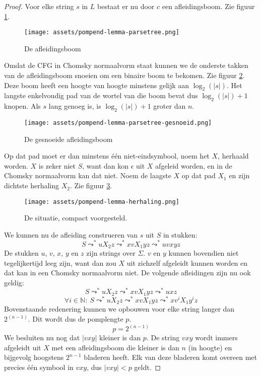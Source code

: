 \documentclass[main.tex]{subfiles}
\begin{document}
\begin{st}
\begin{proof}
    Voor elke string $s$ in $L$ bestaat er nu door $c$ een afleidingsboom. Zie figuur \ref{fig:afleidingsboom}.
    \begin{figure}[H]
      \centering
      \texttt{[image: assets/pompend-lemma-parsetree.png]}      
      \caption{De afleidingsboom}
      \label{fig:afleidingsboom}
    \end{figure}
    Omdat de CFG in Chomsky normaalvorm staat kunnen we de onderste takken van de afleidingsboom snoeien om een binaire boom te bekomen. Zie figuur \ref{fig:afleidingsboom-gesnoeid}.
    Deze boom heeft een hoogte van hoogte minstens gelijk aan $\log_{2}(|s|)$.
    Het langste enkelvoudig pad van de wortel van die boom bevat dus $\log_{2}(|s|)+1$ knopen.
    Als $s$ lang genoeg is, is $\log_{2}(|s|) + 1$ groter dan $n$.
    \begin{figure}[H]
      \centering
      \texttt{[image: assets/pompend-lemma-parsetree-gesnoeid.png]}      
      \caption{De gesnoeide afleidingsboom}
      \label{fig:afleidingsboom-gesnoeid}
    \end{figure}
    Op dat pad moet er dan minstens \'e\'en niet-eindsymbool, noem het $X$, herhaald worden.
    $X$ is zeker niet $S$, want dan kon $\epsilon$ uit $X$ afgeleid worden, en in de Chomsky normaalvorm kan dat niet.
    Noem de laagste $X$ op dat pad $X_{1}$ en zijn dichtste herhaling $X_{2}$. 
    Zie figuur \ref{fig:afleidingsboom-compact}.
    \begin{figure}[H]
      \centering
      \texttt{[image: assets/pompend-lemma-herhaling.png]}      
      \caption{De situatie, compact voorgesteld.}
      \label{fig:afleidingsboom-compact}
    \end{figure}
    We kunnen nu de afleiding construeren van $s$ uit $S$ in stukken:
    \[ S \leadsto^{*} uX_{2}z \leadsto^{*} xvX_{1}yz \leadsto^{*} uvxyz \]
    De stukken $u$, $v$, $x$, $y$ en $z$ zijn strings over $\Sigma$.
    $v$ en $y$ kunnen bovendien niet tegelijkertijd leeg zijn, want dan zou $X$ uit zichzelf afgeleidt kunnen worden en dat kan in een Chomsky normaalvorm niet.
    De volgende afleidingen zijn nu ook geldig:
    \[ S \leadsto^{*} uX_{2}z \leadsto^{*} xvX_{1}yz \leadsto^{*} uxz \]
    \[ \forall i \in \mathbb{N}:\ S \leadsto^{*} uX_{2}z \leadsto^{*} xvX_{1}yz \leadsto^{*} xv^{i}X_{1}y^{i}z \]
    Bovenstaande redenering kunnen we opbouwen voor elke string langer dan $2^{(n-1)}$.
    Dit wordt dus de pomplengte $p$.
    \[ p = 2^{(n-1)} \]
    We besluiten nu nog dat $|vxy|$ kleiner is dan $p$.
    De string $vxy$ wordt immers afgeleidt uit $X$ met een afleidingsboom die kleiner is dan $n$ (in hoogte) en bijgevolg hoogstens $2^{n-1}$ bladeren heeft.
    Elk van deze bladeren komt overeen met precies \'e\'en symbool in $vxy$, dus $|vxy| < p$ geldt.
  \end{proof}
\end{st}
\end{document}
